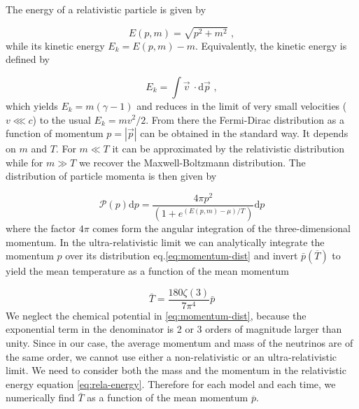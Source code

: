 The energy of a relativistic particle is given by

\begin{equation}
E(p,m)=\sqrt{p^{2}+m^{2}}\,\,,\label{eq:rela-energy}
\end{equation}
while its kinetic energy $E_{k}=E(p,m)-m$. Equivalently, the kinetic
energy is defined by

\begin{equation}
E_{k}=\int\vec{v}\:\cdot\mbox{d}\vec{p}\,\,,
\end{equation}
which yields $E_{k}=m(\gamma-1)$ and reduces in the limit of very
small velocities ($v\lll c$) to the usual $E_{k}=mv^{2}/2$. From
there the Fermi-Dirac distribution as a function of momentum $p=|\vec{p}|$
can be obtained in the standard way. It depends on $m$ and $T$.
For $m\ll T$ it can be approximated by the relativistic distribution
while for $m\gg T$ we recover the Maxwell-Boltzmann distribution.
The distribution of particle momenta is then given by

\begin{equation}
\mathcal{P}(p)\mbox{d}p=\frac{4\pi p^{2}}{(1+e^{(E(p,m)-\mu)/T})}\mbox{d}p\label{eq:momentum-dist}
\end{equation}
where the factor $4\pi$ comes form the angular integration of the
three-dimensional momentum. In the ultra-relativistic limit we can
analytically integrate the momentum $p$ over its distribution eq.\ref{eq:momentum-dist}
and invert $\bar{p}(\overline{T})$ to yield the mean temperature
as a function of the mean momentum

\begin{equation}
\bar{T}=\frac{180\zeta(3)}{7\pi^{4}}\bar{p}
\end{equation}
We neglect the chemical potential in \cref{eq:momentum-dist},
because the exponential term in the denominator is 2 or 3 orders of
magnitude larger than unity. Since in our case, the average momentum
and mass of the neutrinos are of the same order, we cannot use either
a non-relativistic or an ultra-relativistic limit. We need to consider
both the mass and the momentum in the relativistic energy equation
\ref{eq:rela-energy}. Therefore for each model and each time,
we numerically find $\bar{T}$ as a function of the mean momentum
$\overline{p}$.

